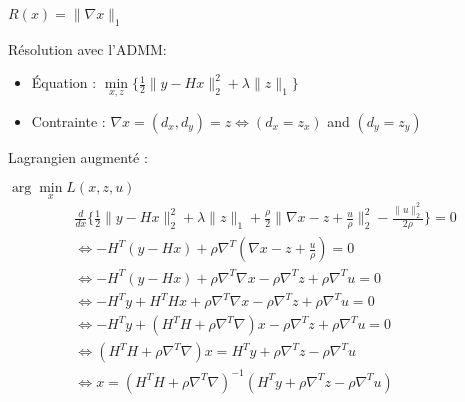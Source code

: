 \begin{frame}{$R(x) = \lVert \nabla x \rVert_{1}$}

Résolution avec l'ADMM:
\begin{itemize}
    \item Équation : $\min\limits_{x, z} \{ 
        \frac{1}{2} \lVert y - Hx \rVert_{2}^{2} 
        + \lambda \lVert z \rVert_{1} 
    \}$
    \item Contrainte : $\nabla x = (d_{x}, d_{y}) = z 
    \iff (d_x = z_x)$ and $(d_y = z_y)$
\end{itemize}
    
Lagrangien augmenté :


\end{frame}

\begin{frame}{$\arg\min\limits_{x} {L(x, z, u)}$}
\begin{align*}
&\frac{d}{dx} \{
    \frac{1}{2} \lVert y - Hx \rVert_{2}^{2} 
    + \lambda \lVert z \rVert_{1} +
    \frac{\rho}{2} \lVert \nabla x - z + \frac{u}{\rho} \rVert_{2}^{2} 
    - \frac{\lVert u \rVert_{2}^{2}}{2\rho} 
\} = 0 \\
&\iff -H^{T} (y - Hx) + \rho \nabla^{T} (\nabla x - z + \frac{u}{\rho}) = 0 \\
&\iff -H^{T} (y - Hx) 
+ \rho \nabla^{T} \nabla x 
- \rho \nabla^{T} z 
+ \rho \nabla^{T} u = 0 \\
&\iff -H^{T} y +  H^{T}H x 
+ \rho \nabla^{T} \nabla x 
- \rho \nabla^{T} z 
+ \rho \nabla^{T} u = 0 \\
&\iff -H^{T} y 
+  (H^{T}H + \rho \nabla^{T} \nabla) x 
- \rho \nabla^{T} z 
+ \rho \nabla^{T} u = 0 \\
&\iff
(H^{T}H + \rho \nabla^{T} \nabla) x 
= H^{T} y  + \rho \nabla^{T} z - \rho \nabla^{T} u\\
&\iff x = (H^{T}H + \rho \nabla^{T} \nabla)^{-1} 
(H^{T} y  + \rho \nabla^{T} z - \rho \nabla^{T} u)\\
\end{align*}
\end{frame}


